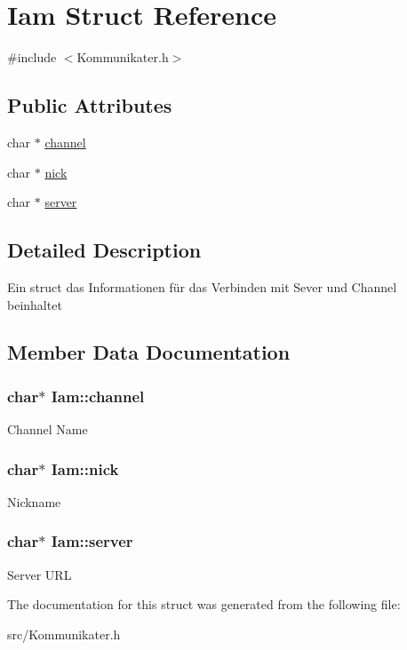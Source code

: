 \hypertarget{structIam}{\section{\-Iam \-Struct \-Reference}
\label{structIam}
}


{\ttfamily \#include $<$\-Kommunikater.\-h$>$}

\subsection*{\-Public \-Attributes}
{\bf }\par
\begin{DoxyCompactItemize}
\item 
char $\ast$ \hyperlink{structIam_a9ca3754e7820817ccf53b26735cb9698}{channel}
\item 
char $\ast$ \hyperlink{structIam_a6fe0512199e341fffcf489d8eeb6c361}{nick}
\item 
char $\ast$ \hyperlink{structIam_af9c41064146b9b8e0377e4ce83095905}{server}
\end{DoxyCompactItemize}



\subsection{\-Detailed \-Description}
\-Ein struct das \-Informationen für das \-Verbinden mit \-Sever und \-Channel beinhaltet 

\subsection{\-Member \-Data \-Documentation}
\hypertarget{structIam_a9ca3754e7820817ccf53b26735cb9698}{
\subsubsection[{channel}]{\setlength{\rightskip}{0pt plus 5cm}char$\ast$ {\bf \-Iam\-::channel}}}\label{structIam_a9ca3754e7820817ccf53b26735cb9698}
\-Channel \-Name \hypertarget{structIam_a6fe0512199e341fffcf489d8eeb6c361}{
\subsubsection[{nick}]{\setlength{\rightskip}{0pt plus 5cm}char$\ast$ {\bf \-Iam\-::nick}}}\label{structIam_a6fe0512199e341fffcf489d8eeb6c361}
\-Nickname \hypertarget{structIam_af9c41064146b9b8e0377e4ce83095905}{
\subsubsection[{server}]{\setlength{\rightskip}{0pt plus 5cm}char$\ast$ {\bf \-Iam\-::server}}}\label{structIam_af9c41064146b9b8e0377e4ce83095905}
\-Server \-U\-R\-L 

\-The documentation for this struct was generated from the following file\-:\begin{DoxyCompactItemize}
\item 
src/\-Kommunikater.\-h\end{DoxyCompactItemize}
